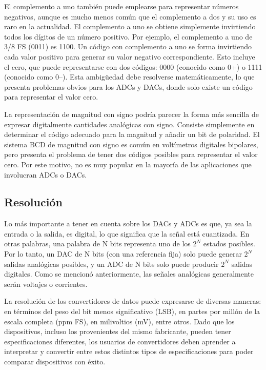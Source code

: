     El complemento a uno también puede emplearse para representar números negativos, aunque es mucho menos común que el complemento a dos y su uso es raro en la actualidad. El complemento a uno se obtiene simplemente invirtiendo todos los dígitos de un número positivo. Por ejemplo, el complemento a uno de 3/8 FS (0011) es 1100. Un código con complemento a uno se forma invirtiendo cada valor positivo para generar su valor negativo correspondiente. Esto incluye el cero, que puede representarse con dos códigos: 0000 (conocido como 0+) o 1111 (conocido como 0–). Esta ambigüedad debe resolverse matemáticamente, lo que presenta problemas obvios para los ADCs y DACs, donde solo existe un código para representar el valor cero.

    La representación de magnitud con signo podría parecer la forma más sencilla de expresar digitalmente cantidades analógicas con signo. Consiste simplemente en determinar el código adecuado para la magnitud y añadir un bit de polaridad. El sistema BCD de magnitud con signo es común en voltímetros digitales bipolares, pero presenta el problema de tener dos códigos posibles para representar el valor cero. Por este motivo, no es muy popular en la mayoría de las aplicaciones que involucran ADCs o DACs.

    \subsection{Resolución}

    Lo más importante a tener en cuenta sobre los DACs y ADCs es que, ya sea la entrada o la salida, es digital, lo que significa que la señal está cuantizada. En otras palabras, una palabra de N bits representa uno de los $2^N$ estados posibles. Por lo tanto, un DAC de N bits (con una referencia fija) solo puede generar $2^N$ salidas analógicas posibles, y un ADC de N bits solo puede producir $2^N$ salidas digitales. Como se mencionó anteriormente, las señales analógicas generalmente serán voltajes o corrientes.

    La resolución de los convertidores de datos puede expresarse de diversas maneras: en términos del peso del bit menos significativo (LSB), en partes por millón de la escala completa (ppm FS), en milivoltios (mV), entre otros. Dado que los dispositivos, incluso los provenientes del mismo fabricante, pueden tener especificaciones diferentes, los usuarios de convertidores deben aprender a interpretar y convertir entre estos distintos tipos de especificaciones para poder comparar dispositivos con éxito.


